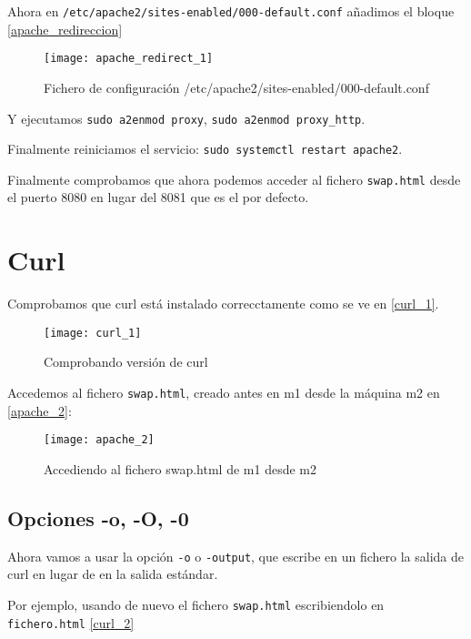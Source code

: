 Ahora en \verb|/etc/apache2/sites-enabled/000-default.conf| añadimos el bloque \eqref{apache_redireccion}

\begin{figure}[h!]
\begin{center}
\caption{Fichero de configuración /etc/apache2/sites-enabled/000-default.conf}
\label{apache_redireccion}
\texttt{[image: apache\_redirect\_1]}
\end{center}
\end{figure}

Y ejecutamos \verb|sudo a2enmod proxy|, \verb|sudo a2enmod proxy_http|.

Finalmente reiniciamos el servicio: \verb|sudo systemctl restart apache2|.

Finalmente comprobamos que ahora podemos acceder al fichero \verb|swap.html| desde el puerto 8080 en lugar del 8081 que es el por defecto.

\chapter{Curl}

Comprobamos que curl está instalado correcctamente como se ve en \eqref{curl_1}.

\begin{figure}[h!]
\begin{center}
\caption{Comprobando versión de curl}
\label{curl_1}
\texttt{[image: curl\_1]}
\end{center}
\end{figure}

Accedemos al fichero \verb|swap.html|, creado antes en m1 desde la máquina m2 en \eqref{apache_2}:

\begin{figure}[h!]
\begin{center}
\caption{Accediendo al fichero swap.html de m1 desde m2 }
\label{apache_2}
\texttt{[image: apache\_2]}
\end{center}
\end{figure}

\section{Opciones -o, -O, -0}

Ahora vamos a usar la opción \verb|-o| o \verb|-output|, que escribe en un fichero la salida de curl en lugar de en la salida estándar.

Por ejemplo, usando de nuevo el fichero \verb|swap.html| escribiendolo en \verb|fichero.html| \eqref{curl_2}

